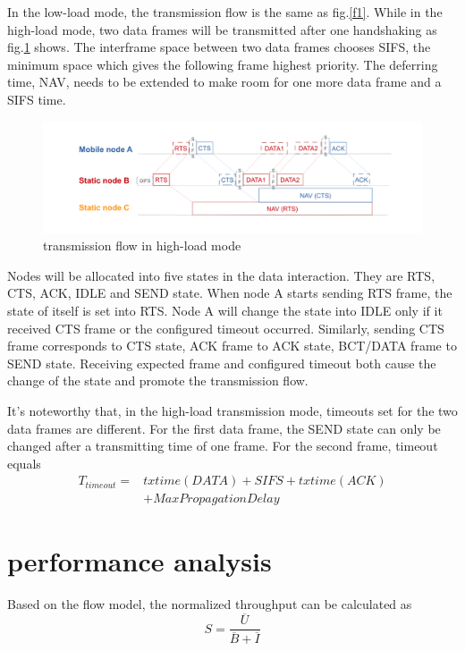 \documentclass[conference]{IEEEtran}
\begin{document}
In the low-load mode, the transmission flow is the same as fig.\ref{f1}. While in the high-load mode, two data frames will be transmitted after one handshaking as fig.\ref{ll} shows. The interframe space between two data frames chooses SIFS, the minimum space which gives the following frame highest priority. The deferring time, NAV, needs to be extended to make room for one more data frame and a SIFS time. 
\begin{figure}[ht]
	\centerline{\includegraphics[scale=0.14]{figures/2.pdf}}
	\caption{transmission flow in high-load mode}
	\label{ll}
\end{figure}


Nodes will be allocated into five states in the data interaction. They are RTS, CTS, ACK, IDLE and SEND state. When node A starts sending RTS frame, the state of itself is set into RTS. Node A will change the state into IDLE only if it received CTS frame or the configured timeout occurred. Similarly, sending CTS frame corresponds to CTS state, ACK frame to ACK state, BCT/DATA frame to SEND state. Receiving expected frame and configured timeout both cause the change of the state and promote the transmission flow.

It's noteworthy that, in the high-load transmission mode, timeouts set for the two data frames are different. For the first data frame, the SEND state can only be changed after a transmitting time of one frame. For the second frame, timeout equals
\begin{equation*}
\begin{aligned}
T_{timeout}=&txtime(DATA)+SIFS+txtime(ACK)\\&+MaxPropagationDelay
\end{aligned}
\end{equation*}


\section{performance analysis}
Based on the flow model\cite{kleinrock1975packet}, the normalized throughput can be calculated as
\begin{equation}
S=\frac{\overline U}{\overline B+\overline I}
\label{11}
\end{equation}
\end{document}
